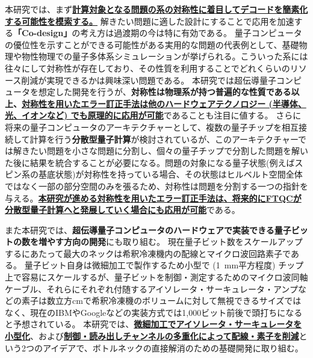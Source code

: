 \documentclass[11pt,a4j,dvipdfmx]{jarticle} 					%
\newcommand{\研究課題名}{誤り耐性量子コンピュータに向けた誤り訂正技術の開発(仮)}
\newcommand{\研究機関名}{東京大学}
\newcommand{\研究代表者氏名}{寺師弘二}
\newcommand{\研究期間の最終元号年度}{10}  %
\newcommand{\mybf}[1]{{\bfseries\sffamily#1}}
\begin{document}
本研究では、まず\mybf{\ul{計算対象となる問題の系の対称性に着目してデコードを簡素化する可能性を模索する。}}
解きたい問題に適した設計にすることで応用を加速する\mybf{「Co-design」}の考え方は過渡期の今は特に有効である。
量子コンピュータの優位性を示すことができる可能性がある実用的な問題の代表例として、基礎物理や物性物理での量子多体系シミュレーションが挙げられる。こういった系には往々にして対称性が存在しており、その性質を利用することでどれくらいのリソース削減が実現できるかは興味深い問題である。
本研究では超伝導量子コンピュータを想定した開発を行うが、\mybf{対称性は物理系が持つ普遍的な性質である以上、\ul{対称性を用いたエラー訂正手法は他のハードウェアテクノロジー (半導体、光、イオンなど) でも原理的に応用が可能}}であることも注目に値する。
さらに将来の量子コンピュータのアーキテクチャーとして、複数の量子チップを相互接続して計算を行う\mybf{分散型量子計算}が検討されているが、このアーキテクチャーでは解きたい問題を小さな問題に分割し、個々の量子チップで分割した問題を解いた後に結果を統合することが必要になる。問題の対象になる量子状態(例えばスピン系の基底状態)が対称性を持っている場合、その状態はヒルベルト空間全体ではなく一部の部分空間のみを張るため、対称性は問題を分割する一つの指針を与える。\mybf{\ul{本研究が進める対称性を用いたエラー訂正手法は、将来的にFTQCが分散型量子計算へと発展していく場合にも応用が可能}}である。

また本研究では、\mybf{超伝導量子コンピュータのハードウェアで実装できる量子ビットの数を増やす方向の開発}にも取り組む。
現在量子ビット数をスケールアップするにあたって最大のネックは希釈冷凍機内の配線とマイクロ波回路素子である。
量子ビット自身は微細加工で製作するため小型で (1~mm平方程度) チップ上で容易にスケールするが、量子ビットを制御・測定するためのマイクロ波同軸ケーブル、それらにそれぞれ付随するアイソレータ・サーキュレータ・アンプなどの素子は数立方cmで希釈冷凍機のボリュームに対して無視できるサイズではなく、現在のIBMやGoogleなどの実装方式では1,000ビット前後で頭打ちになると予想されている。
本研究では、\mybf{\ul{微細加工でアイソレータ・サーキュレータを小型化}}、および\mybf{\ul{制御・読み出しチャンネルの多重化によって配線・素子を削減}}という2つのアイデアで、ボトルネックの直接解消のための基礎開発に取り組む。\\
\end{document}
